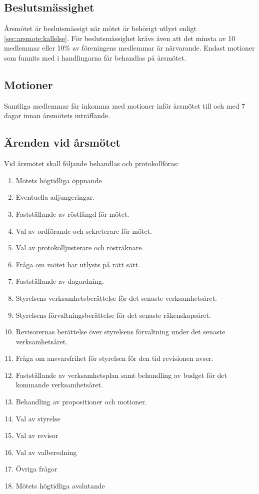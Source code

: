 \documentclass[a4paper,11pt]{article}
\begin{document}
\subsection{Beslutsmässighet}
Årsmötet är beslutsmässigt när mötet är behörigt utlyst enligt \ref{sec:arsmote:kallelse}. För beslutsmässighet krävs även att det minsta av 10 medlemmar eller 10\% av föreningens medlemmar är närvarande. Endast motioner som funnits med i handlingarna får behandlas på årsmötet.

\subsection{Motioner}
Samtliga medlemmar får inkomma med motioner inför årsmötet till och med 7 dagar innan årsmötets inträffande.


\subsection{Ärenden vid årsmötet}
Vid årsmötet skall följande behandlas och protokollföras:

\begin{enumerate}
    \item Mötets högtidliga öppnande
    \item Eventuella adjungeringar.
    \item Fastställande av röstlängd för mötet.
    \item Val av ordförande och sekreterare för mötet.
    \item Val av protokolljusterare och rösträknare.
    \item Fråga om mötet har utlysts på rätt sätt.
    \item Fastställande av dagordning.
    \item Styrelsens verksamhetsberättelse för det senaste verksamhetsåret.
    \item Styrelsens förvaltningsberättelse för det senaste räkenskapsåret.
    \item Revisorernas berättelse över styrelsens förvaltning under det senaste verksamhetsåret.
    \item Fråga om ansvarsfrihet för styrelsen för den tid revisionen avser.
    \item Fastställande av verksamhetsplan samt behandling av budget för det kommande verksamhetsåret.
    \item Behandling av propositioner och motioner.
    \item Val av styrelse
    \item Val av revisor
    \item Val av valberedning
    \item Övriga frågor
    \item Mötets högtidliga avslutande
\end{enumerate}
\end{document}
